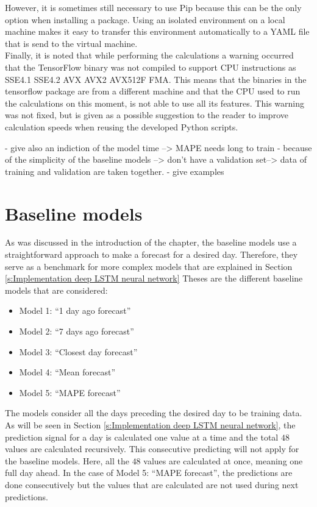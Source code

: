 However, it is sometimes still necessary to use Pip because this can be the only option when installing a package. Using an isolated environment on a local machine makes it easy to transfer this environment automatically to a YAML file that is send to the virtual machine.\\

Finally, it is noted that while performing the calculations a warning occurred that the TensorFlow binary was not compiled to support CPU instructions as SSE4.1 SSE4.2 AVX AVX2 AVX512F FMA. This means that the binaries in the tensorflow package are from a different machine and that the CPU used to run the calculations on this moment, is not able to use all its features. This warning was not fixed, but is given as a possible suggestion to the reader to improve calculation speeds when reusing the developed Python scripts.

- give also an indiction of the model time --> MAPE needs long to train
- because of the simplicity of the baseline models --> don't have a validation set--> data of training and validation are taken together. 
- give examples

\section{Baseline models}\label{s:Baseline models}
As was discussed in the introduction of the chapter, the baseline models use a straightforward approach to make a forecast for a desired day. Therefore, they serve as a benchmark for more complex models that are explained in Section \ref{s:Implementation deep LSTM neural network} Theses are the different baseline models that are considered:

\begin{itemize}
	\item Model 1: ``1 day ago forecast''
	\item Model 2: ``7 days ago forecast''
	\item Model 3: ``Closest day forecast''
	\item Model 4: ``Mean forecast''
	\item Model 5: ``MAPE forecast''
\end{itemize} 

The models consider all the days preceding the desired day to be training data. As will be seen in Section \ref{s:Implementation deep LSTM neural network}, the prediction signal for a day is calculated one value at a time and the total $ 48 $ values are calculated recursively. This consecutive predicting will not apply for the baseline models. Here, all the $ 48 $ values are calculated at once, meaning one full day ahead. In the case of Model 5: ``MAPE forecast'', the predictions are done consecutively but the values that are calculated are not used during next predictions.\\


